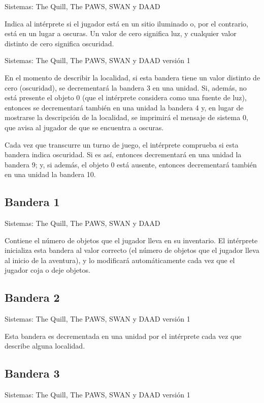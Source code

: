 \documentclass[11pt, a5paper]{article}
\newcommand{\quill}{\textsf{The Quill}\xspace}
\newcommand{\paw}{\textsf{The PAWS}\xspace}
\newcommand{\swan}{\textsf{SWAN}\xspace}
\newcommand{\daad}{\textsf{DAAD}\xspace}
\newcommand{\sistemas}[1]{\noindent Sistemas: #1 \nopagebreak}
\begin{document}
\sistemas{\quill, \paw, \swan y \daad}

Indica al intérprete si el jugador está en un sitio iluminado o, por el contrario, está en un lugar a oscuras. Un valor de cero significa luz, y cualquier valor distinto de cero significa oscuridad.

\sistemas{\quill, \paw, \swan y \daad versión 1}

En el momento de describir la localidad, si esta bandera tiene un valor distinto de cero (oscuridad), se decrementará la bandera 3 en una unidad. Si, además, no está presente el objeto 0 (que el intérprete considera como una fuente de luz), entonces se decrementará también en una unidad la bandera 4 y, en lugar de mostrarse la descripción de la localidad, se imprimirá el mensaje de sistema 0, que avisa al jugador de que se encuentra a oscuras.

Cada vez que transcurre un turno de juego, el intérprete comprueba si esta bandera indica oscuridad. Si es así, entonces decrementará en una unidad la bandera 9; y, si además, el objeto 0 está ausente, entonces decrementará también en una unidad la bandera 10.

\subsection{Bandera 1}\label{flag1}

\sistemas{\quill, \paw, \swan y \daad}

Contiene el número de objetos que el jugador lleva en su inventario. El intérprete inicializa esta bandera al valor correcto (el número de objetos que el jugador lleva al inicio de la aventura), y lo modificará automáticamente cada vez que el jugador coja o deje objetos.

\subsection{Bandera 2}

\sistemas{\quill, \paw, \swan y \daad versión 1}

Esta bandera es decrementada en una unidad por el intérprete cada vez que describe alguna localidad.

\subsection{Bandera 3}

\sistemas{\quill, \paw, \swan y \daad versión 1}
\end{document}
